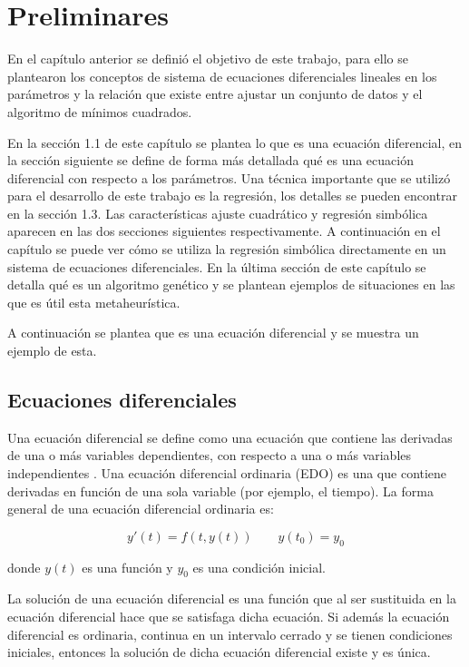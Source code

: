 \chapter{Preliminares}\label{chapter:preliminaries}

En el capítulo anterior se definió el objetivo de este trabajo, para ello se plantearon los conceptos de sistema de ecuaciones diferenciales lineales en los parámetros y la relación que existe entre ajustar un conjunto de datos y el algoritmo de mínimos cuadrados.

En la sección 1.1 de este capítulo se plantea lo que es una ecuación diferencial, en la sección siguiente se define de forma más detallada qué es una ecuación diferencial con respecto a los parámetros. Una técnica importante que se utilizó para el desarrollo de este trabajo es la regresión, los detalles se pueden encontrar en la sección 1.3. Las características ajuste cuadrático y regresión simbólica aparecen en las dos secciones siguientes respectivamente. A continuación en el capítulo se puede ver cómo se utiliza la regresión simbólica directamente en un sistema de ecuaciones diferenciales. En la última sección de este capítulo se detalla qué es un algoritmo genético y se plantean ejemplos de situaciones en las que es útil esta metaheurística.

A continuación se plantea que es una ecuación diferencial y se muestra un ejemplo de esta.

\section{Ecuaciones diferenciales}

Una ecuación diferencial se define como una ecuación que contiene las derivadas de una o más variables dependientes, con respecto a una o más variables independientes \cite{gaucel2014learning}. Una ecuación diferencial ordinaria (EDO) es una que contiene derivadas en función de una sola variable (por ejemplo, el tiempo). La forma general de una ecuación diferencial ordinaria es:

$$y'(t)=f(t, y(t)) \qquad y(t_0) = y_0$$

donde $y(t)$ es una función y $y_0$ es una condición inicial.

La solución de una ecuación diferencial es una función que al ser sustituida en la ecuación diferencial hace que se satisfaga dicha ecuación. Si además la ecuación diferencial es ordinaria, continua en un intervalo cerrado y se tienen condiciones iniciales, entonces la solución de dicha ecuación diferencial existe y es única. \cite{coddington1955theory}

